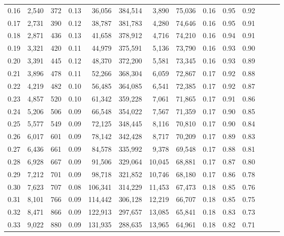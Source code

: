 \begin{tabular}{rrrrrrrrrrrrrr}
0.16 &   2,540 &    372 &  0.13 &   36,056 &  384,514 &   3,890 &  75,036 &  0.16 &  0.95 &      0.92 \\
0.17 &   2,731 &    390 &  0.12 &   38,787 &  381,783 &   4,280 &  74,646 &  0.16 &  0.95 &      0.91 \\
0.18 &   2,871 &    436 &  0.13 &   41,658 &  378,912 &   4,716 &  74,210 &  0.16 &  0.94 &      0.91 \\
0.19 &   3,321 &    420 &  0.11 &   44,979 &  375,591 &   5,136 &  73,790 &  0.16 &  0.93 &      0.90 \\
0.20 &   3,391 &    445 &  0.12 &   48,370 &  372,200 &   5,581 &  73,345 &  0.16 &  0.93 &      0.89 \\
0.21 &   3,896 &    478 &  0.11 &   52,266 &  368,304 &   6,059 &  72,867 &  0.17 &  0.92 &      0.88 \\
0.22 &   4,219 &    482 &  0.10 &   56,485 &  364,085 &   6,541 &  72,385 &  0.17 &  0.92 &      0.87 \\
0.23 &   4,857 &    520 &  0.10 &   61,342 &  359,228 &   7,061 &  71,865 &  0.17 &  0.91 &      0.86 \\
0.24 &   5,206 &    506 &  0.09 &   66,548 &  354,022 &   7,567 &  71,359 &  0.17 &  0.90 &      0.85 \\
0.25 &   5,577 &    549 &  0.09 &   72,125 &  348,445 &   8,116 &  70,810 &  0.17 &  0.90 &      0.84 \\
0.26 &   6,017 &    601 &  0.09 &   78,142 &  342,428 &   8,717 &  70,209 &  0.17 &  0.89 &      0.83 \\
0.27 &   6,436 &    661 &  0.09 &   84,578 &  335,992 &   9,378 &  69,548 &  0.17 &  0.88 &      0.81 \\
0.28 &   6,928 &    667 &  0.09 &   91,506 &  329,064 &  10,045 &  68,881 &  0.17 &  0.87 &      0.80 \\
0.29 &   7,212 &    701 &  0.09 &   98,718 &  321,852 &  10,746 &  68,180 &  0.17 &  0.86 &      0.78 \\
0.30 &   7,623 &    707 &  0.08 &  106,341 &  314,229 &  11,453 &  67,473 &  0.18 &  0.85 &      0.76 \\
0.31 &   8,101 &    766 &  0.09 &  114,442 &  306,128 &  12,219 &  66,707 &  0.18 &  0.85 &      0.75 \\
0.32 &   8,471 &    866 &  0.09 &  122,913 &  297,657 &  13,085 &  65,841 &  0.18 &  0.83 &      0.73 \\
0.33 &   9,022 &    880 &  0.09 &  131,935 &  288,635 &  13,965 &  64,961 &  0.18 &  0.82 &      0.71 \\

\end{tabular}

